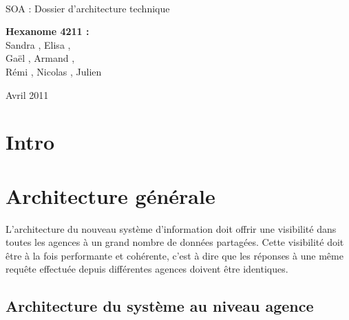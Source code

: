 \documentclass[a4paper]{article}
\begin{document}
\begin{titlepage}
~ 
\vfill
	\begin{center}
		\begin{Huge}
		SOA : Dossier d'architecture technique\\
		\end{Huge} 
\vfill
		\textbf{Hexanome 4211 :} 
		\\Sandra {}, Elisa , 
		\\Gaël , Armand , 
		\\Rémi , Nicolas , Julien \\

\vfill		
		\begin{Large}
		Avril 2011
		\end{Large}
\vfill

	\end{center}
\vfill
\end{titlepage}

\newpage
\tableofcontents
\newpage

\section*{Intro}

\section{Architecture générale}


L'architecture du nouveau système d'information doit offrir une visibilité dans toutes les agences à un grand nombre de données partagées. Cette visibilité doit être à la fois performante et cohérente, c'est à dire que les réponses à une même requête effectuée depuis différentes agences doivent être identiques.

\subsection{Architecture du système au niveau agence}
\end{document}
